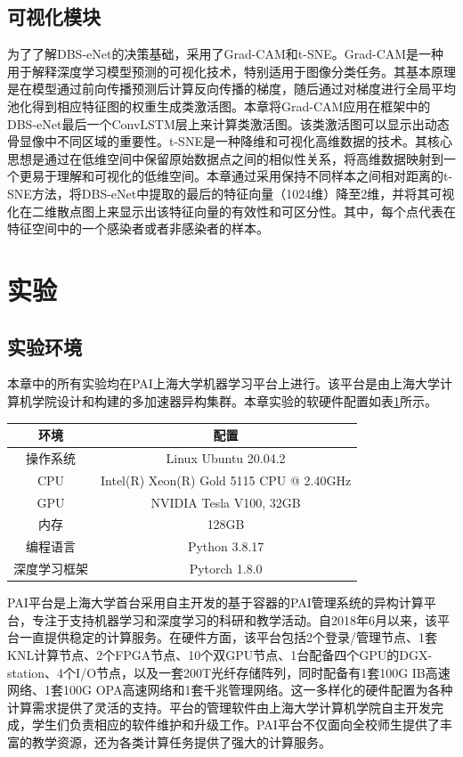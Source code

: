\subsection{可视化模块}

为了了解DBS-eNet的决策基础，采用了Grad-CAM和t-SNE。Grad-CAM是一种用于解释深度学习模型预测的可视化技术，特别适用于图像分类任务。其基本原理是在模型通过前向传播预测后计算反向传播的梯度，随后通过对梯度进行全局平均池化得到相应特征图的权重生成类激活图。本章将Grad-CAM应用在框架中的DBS-eNet最后一个ConvLSTM层上来计算类激活图。该类激活图可以显示出动态骨显像中不同区域的重要性。t-SNE是一种降维和可视化高维数据的技术。其核心思想是通过在低维空间中保留原始数据点之间的相似性关系，将高维数据映射到一个更易于理解和可视化的低维空间。本章通过采用保持不同样本之间相对距离的t-SNE方法，将DBS-eNet中提取的最后的特征向量（1024维）降至2维，并将其可视化在二维散点图上来显示出该特征向量的有效性和可区分性。其中，每个点代表在特征空间中的一个感染者或者非感染者的样本。

\section{实验}

\subsection{实验环境}

本章中的所有实验均在PAI上海大学机器学习平台上进行。该平台是由上海大学计算机学院设计和构建的多加速器异构集群。本章实验的软硬件配置如表\ref{tab:chap03_experimental_config}所示。
\begin{table}[htbp]
  \centering
  \begin{tabular}{cc}
    \toprule
    环境         & 配置                                     \\
    \midrule
    操作系统     & Linux Ubuntu 20.04.2                     \\
    CPU          & Intel(R) Xeon(R) Gold 5115 CPU @ 2.40GHz \\
    GPU          & NVIDIA Tesla V100, 32GB                  \\
    内存         & 128GB                                    \\
    编程语言     & Python 3.8.17                            \\
    深度学习框架 & Pytorch 1.8.0                            \\
    \bottomrule
  \end{tabular}
  \label{tab:chap03_experimental_config}
\end{table}
PAI平台是上海大学首台采用自主开发的基于容器的PAI管理系统的异构计算平台，专注于支持机器学习和深度学习的科研和教学活动。自2018年6月以来，该平台一直提供稳定的计算服务。在硬件方面，该平台包括2个登录/管理节点、1套KNL计算节点、2个FPGA节点、10个双GPU节点、1台配备四个GPU的DGX-station、4个I/O节点，以及一套200T光纤存储阵列，同时配备有1套100G IB高速网络、1套100G OPA高速网络和1套千兆管理网络。这一多样化的硬件配置为各种计算需求提供了灵活的支持。平台的管理软件由上海大学计算机学院自主开发完成，学生们负责相应的软件维护和升级工作。PAI平台不仅面向全校师生提供了丰富的教学资源，还为各类计算任务提供了强大的计算服务。

